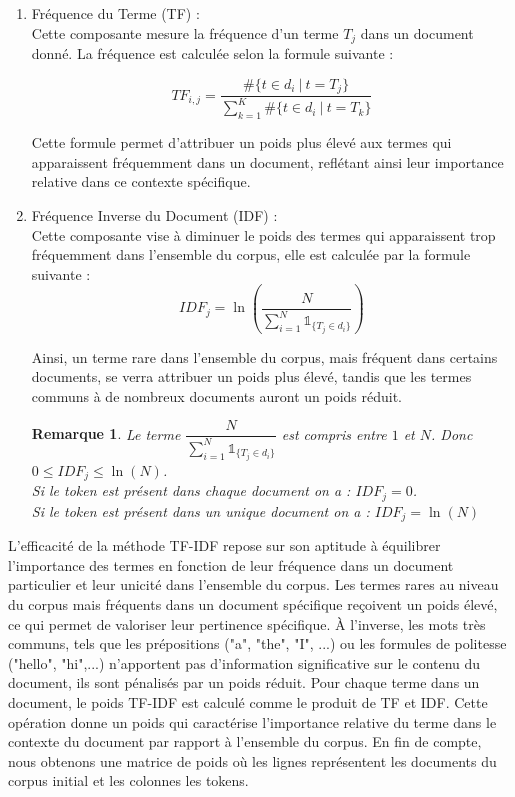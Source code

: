 \documentclass[12pt]{article}
\newtheorem{rmq}{Remarque}
\theoremstyle{definition}
\begin{document}
	\begin{enumerate}
		\item Fréquence du Terme (TF) :\\
		
		Cette composante mesure la fréquence d'un terme $T_j$ dans un document donné. La fréquence est calculée selon la formule suivante : 
		
		$$  TF_{i,j} = \dfrac{\#\{t\in d_i ~|~ t = T_j\}}{\displaystyle\sum_{k=1}^{K}\#\{t\in d_i ~|~ t = T_k\}}$$
		
		Cette formule permet d'attribuer un poids plus élevé aux termes qui apparaissent fréquemment dans un document, reflétant ainsi leur importance relative dans ce contexte spécifique.
		
		\item Fréquence Inverse du Document (IDF) : \\
		
		Cette composante vise à diminuer le poids des termes qui apparaissent trop fréquemment dans l'ensemble du corpus, elle est calculée par la formule suivante :
		$$  IDF_{j} = \ln\left(\dfrac{N}{\sum_{i=1}^{N}\mathbb{1}_{\{T_j \in d_i\}}}\right)$$ 
		
		Ainsi, un terme rare dans l'ensemble du corpus, mais fréquent dans certains documents, se verra attribuer un poids plus élevé, tandis que les termes communs à de nombreux documents auront un poids réduit.

		\begin{rmq}
			Le terme $\dfrac{N}{\sum_{i=1}^{N}\mathbb{1}_{\{T_j \in d_i\}}}$ est compris entre $1$ et $N$. Donc $0\leq IDF_{j} \leq \ln(N)$.\\
			
			Si le token est présent dans chaque document on a : $IDF_{j} = 0$.\\
			Si le token est présent dans un unique document on a : $IDF_{j} = \ln(N)$  
		\end{rmq}
		
	\end{enumerate}
	
	L'efficacité de la méthode TF-IDF repose sur son aptitude à équilibrer l'importance des termes en fonction de leur fréquence dans un document particulier et leur unicité dans l'ensemble du corpus. Les termes rares au niveau du corpus mais fréquents dans un document spécifique reçoivent un poids élevé, ce qui permet de valoriser leur pertinence spécifique. À l'inverse, les mots très communs, tels que les prépositions ("a", "the", "I", ...) ou les formules de politesse ("hello", "hi",...)  n'apportent pas d'information significative sur le contenu du document, ils sont pénalisés par un poids réduit. Pour chaque terme dans un document, le poids TF-IDF est calculé comme le produit de TF et IDF. Cette opération donne un poids qui caractérise l'importance relative du terme dans le contexte du document par rapport à l'ensemble du corpus. En fin de compte, nous obtenons une matrice de poids où les lignes représentent les documents du corpus initial et les colonnes les tokens. 
		
\end{document}
